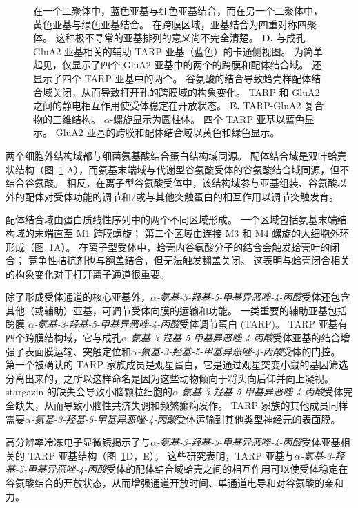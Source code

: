 \begin{figure}[htbp]
{		在一个二聚体中，蓝色亚基与红色亚基结合，而在另一个二聚体中，黄色亚基与绿色亚基结合。
		在跨膜区域，亚基结合为四重对称四聚体。
		这种极不寻常的亚基排列的意义尚不完全清楚\cite{sobolevsky2009x}。
		\textbf{D.} 与成孔 GluA2 亚基相关的辅助 TARP 亚基（蓝色）的卡通侧视图。
		为简单起见，仅显示了四个 GluA2 亚基中的两个的跨膜和配体结合域。
		还显示了四个 TARP 亚基中的两个。
		谷氨酸的结合导致蛤壳样配体结合域关闭，从而导致打开孔的跨膜域的构象变化。
		TARP 和 GluA2 之间的静电相互作用使受体稳定在开放状态\cite{mayer2016structural}。 
		\textbf{E.} TARP-GluA2 复合物的三维结构。
		$\alpha$-螺旋显示为圆柱体。
		四个 TARP 亚基以蓝色显示。
		GluA2 亚基的跨膜和配体结合域以黄色和绿色显示\cite{mayer2016structural}。}
	\label{fig:13_5}
\end{figure}


两个细胞外结构域都与细菌氨基酸结合蛋白结构域同源。 配体结合域是双叶蛤壳状结构（图~\ref{fig:13_5} A），而氨基末端域与代谢型谷氨酸受体的谷氨酸结合域同源，但不结合谷氨酸。
相反，在离子型谷氨酸受体中，该结构域参与亚基组装、谷氨酸以外的配体对受体功能的调节和/或与其他突触蛋白的相互作用以调节突触发育。


配体结合域由蛋白质线性序列中的两个不同区域形成。
一个区域包括氨基末端结构域的末端直至 M1 跨膜螺旋；
第二个区域由连接 M3 和 M4 螺旋的大细胞外环形成（图~\ref{fig:13_5}A）。
在离子型受体中，蛤壳内谷氨酸分子的结合会触发蛤壳叶的闭合；
竞争性拮抗剂也与翻盖结合，但无法触发翻盖关闭。
这表明与蛤壳闭合相关的构象变化对于打开离子通道很重要。


除了形成受体通道的核心亚基外，\textit{$\alpha$-氨基-3-羟基-5-甲基异恶唑-4-丙酸}受体还包含其他（或辅助）亚基，可调节受体向膜的运输和功能。
一类重要的辅助亚基包括跨膜 \textit{$\alpha$-氨基-3-羟基-5-甲基异恶唑-4-丙酸}受体调节蛋白 (TARP)。
TARP 亚基有四个跨膜结构域，它与成孔\textit{$\alpha$-氨基-3-羟基-5-甲基异恶唑-4-丙酸}受体亚基的结合增强了表面膜运输、突触定位和\textit{$\alpha$-氨基-3-羟基-5-甲基异恶唑-4-丙酸}受体的门控。
第一个被确认的 TARP 家族成员是观星蛋白，它是通过观星突变小鼠的基因筛选分离出来的，之所以这样命名是因为这些动物倾向于将头向后仰并向上凝视。
stargazin 的缺失会导致小脑颗粒细胞的\textit{$\alpha$-氨基-3-羟基-5-甲基异恶唑-4-丙酸}受体完全缺失，从而导致小脑性共济失调和频繁癫痫发作。
TARP 家族的其他成员同样需要\textit{$\alpha$-氨基-3-羟基-5-甲基异恶唑-4-丙酸}受体运输到其他类型神经元的表面膜。


高分辨率冷冻电子显微镜揭示了与\textit{$\alpha$-氨基-3-羟基-5-甲基异恶唑-4-丙酸}受体亚基相关的 TARP 亚基结构（图~\ref{fig:13_5}D，E）。
这些研究表明，TARP 亚基与\textit{$\alpha$-氨基-3-羟基-5-甲基异恶唑-4-丙酸}受体的配体结合域蛤壳之间的相互作用可以使受体稳定在谷氨酸结合的开放状态，从而增强通道开放时间、单通道电导和对谷氨酸的亲和力。


